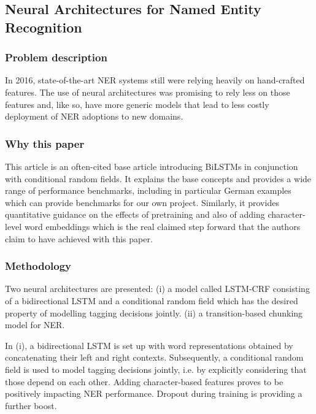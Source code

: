\documentclass[11pt]{article}
\begin{document}
\subsection{Neural Architectures for Named Entity Recognition \citet{lample-etal-2016-neural} }

\subsubsection{Problem description}

In 2016, state-of-the-art NER systems still were relying heavily on hand-crafted features. The use of neural architectures was promising to rely less on those features and, like so, have more generic models that lead to less costly deployment of NER adoptions to new domains. 

\subsubsection{Why this paper}

This article is an often-cited base article introducing BiLSTMs in conjunction with conditional random fields. It explains the base concepts and provides a wide range of performance benchmarks, including in particular German examples which can provide benchmarks for our own project. Similarly, it provides quantitative guidance on the effects of pretraining and also of adding character-level word embeddings which is the real claimed step forward that the authors claim to have achieved with this paper. 

\subsubsection{Methodology}

Two neural architectures are presented: (i) a model called LSTM-CRF consisting of a bidirectional LSTM and a conditional random field which has the desired property of modelling tagging decisions jointly. (ii) a transition-based chunking model for NER.

In (i), a bidirectional LSTM is set up with word representations obtained by concatenating their left and right contexts. Subsequently, a conditional random field is used to model tagging decisions jointly, i.e. by explicitly considering that those depend on each other. Adding character-based features proves to be positively impacting NER performance. Dropout during training is providing a further boost. 
\end{document}

